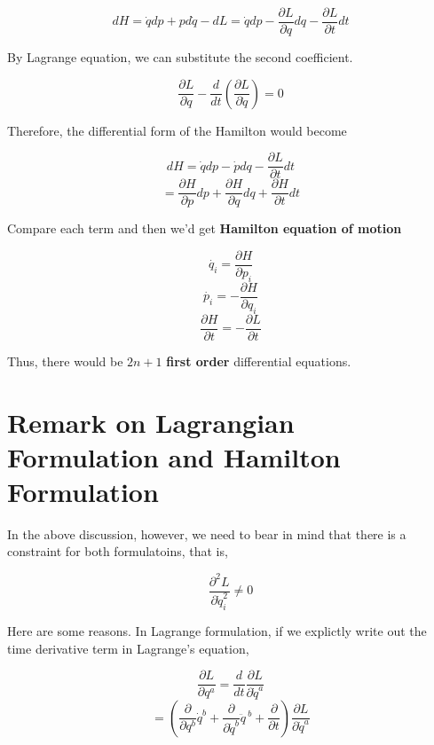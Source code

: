 \documentclass[12pt]{article}
\numberwithin{equation}{section}
\begin{document}
\begin{center}
    \[ dH = \dot{q}dp + pd\dot{q} - dL = \dot{q}dp - \frac{ \partial{L} }{ \partial{q} } dq - \frac{ \partial{L} }{ \partial{t} } dt \]
\end{center}

By Lagrange equation, we can substitute the second coefficient.

\begin{center}
    \[ \frac{\partial{L}}{\partial{q}} - \frac{d}{dt} \left( \frac{ \partial{L} }{ \partial{\dot{q}} }\right)= 0 \]
\end{center}

Therefore, the differential form of the Hamilton would become

\begin{center}
    \[ dH = \dot{q} dp - \dot{p} dq - \frac{\partial{L}}{\partial{t}} dt\]
    \[ = \frac{ \partial{H} }{ \partial{p} } dp + \frac{ \partial{H} }{ \partial{q} } dq + \frac{ \partial{H} }{ \partial{t} } dt\]
\end{center}

Compare each term and then we'd get \textbf{Hamilton equation of motion}

\begin{center}
    \[ \dot{q_i} = \frac{ \partial{H} }{ \partial{p_i} }\]
    \[ \dot{p_i} = -\frac{ \partial{H} }{ \partial{q_i} }\]
    \[ \frac{ \partial{H} }{ \partial{t} } = -\frac{ \partial{L} }{ \partial{t} }\]
\end{center}

Thus, there would be $2n+1$ \textbf{first order} differential equations.

\section{Remark on Lagrangian Formulation and Hamilton Formulation}

In the above discussion, however, we need to bear in mind that there is a constraint for both formulatoins, that is, 

\begin{center}
    \[ \frac{\partial^2 L}{\partial \dot{q}_i^2} \neq 0 \]
\end{center}

Here are some reasons. In Lagrange formulation, if we explictly write out the time derivative term in Lagrange's equation,

\begin{center}
    \[ \frac{\partial L}{\partial q^a} = \frac{d}{dt} \frac{\partial L}{\partial \dot{q}^a} \]
    \[ = \left(\frac{\partial}{\partial q^b}\dot{q}^b + \frac{\partial}{\partial \dot{q}^b}\ddot{q}^{\ b} + \frac{\partial }{\partial t} \right) \frac{\partial L}{\partial \dot{q}^a} \]
\end{center}
\end{document}
